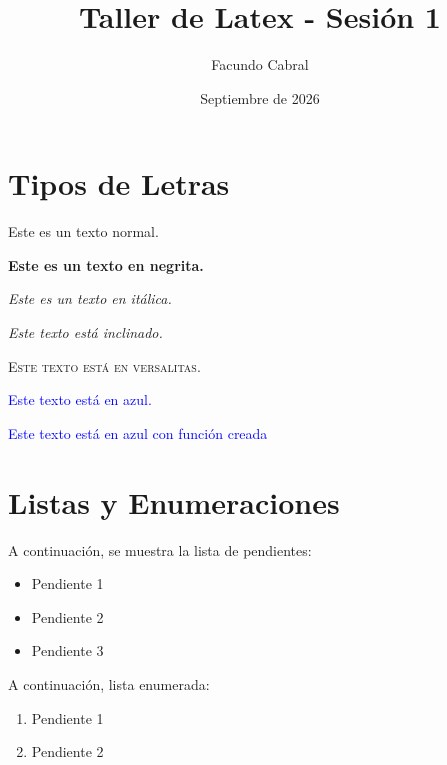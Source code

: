 \documentclass[a4paper,12pt]{article}
\title{Taller de Latex - Sesión 1}
\author{Facundo Cabral}
\date{Septiembre de 2026}
\newcommand{\azul}[1]{\textcolor{blue}{#1}}
\begin{document}
\maketitle

\newpage

\tableofcontents

\newpage

\section{Tipos de Letras}

Este es un texto normal.

\textbf{Este es un texto en negrita.}

\textit{Este es un texto en itálica.}

\textsl{Este texto está inclinado.}

\textsc{Este texto está en versalitas.}

\textcolor{blue}{Este texto está en azul.}

\azul{Este texto está en azul con función creada}

\section{Listas y Enumeraciones}

\noindent A continuación, se muestra la lista de pendientes:

\begin{itemize}[leftmargin=*, nosep]
    \item Pendiente 1
    \item[$\bullet$] Pendiente 2
    \item[$\circ$] Pendiente 3
\end{itemize}

\vspace*{0.5cm}

A continuación, lista enumerada:

\begin{enumerate}
    \item Pendiente 1
    \item Pendiente 2
\end{enumerate}

\newpage
\end{document}
